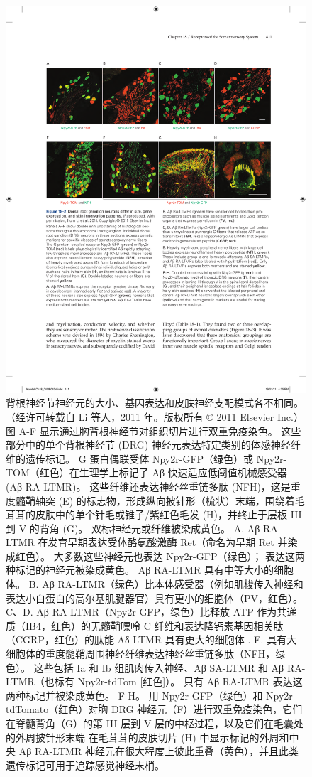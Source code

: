 \begin{figure}[htbp]
	\centering
	\includegraphics[width=1.0\linewidth]{chap18/fig_18_2}
	\caption{背根神经节神经元的大小、基因表达和皮肤神经支配模式各不相同。 （经许可转载自 Li 等人，2011 年。版权所有 © 2011 Elsevier Inc.）图 A-F 显示通过胸背根神经节对组织切片进行双重免疫染色。 
		这些部分中的单个背根神经节 (DRG) 神经元表达特定类别的体感神经纤维的遗传标记。 
		G 蛋白偶联受体 Npy2r-GFP（绿色）或 Npy2r-TOM（红色）在生理学上标记了 Aβ 快速适应低阈值机械感受器 (Aβ RA-LTMR)。 这些纤维还表达神经丝重链多肽 (NFH)，这是重度髓鞘轴突 (E) 的标志物，形成纵向披针形（梳状）末端，围绕着毛茸茸的皮肤中的单个针毛或锥子/紫红色毛发 (H)，并终止于层板 III 到 V 的背角 (G)。 
		双标神经元或纤维被染成黄色。 
		A. Aβ RA-LTMR 在发育早期表达受体酪氨酸激酶 Ret（命名为早期 Ret 并染成红色）。 
		大多数这些神经元也表达 Npy2r-GFP（绿色）； 表达这两种标记的神经元被染成黄色。 Aβ RA-LTMR 具有中等大小的细胞体。 
		B. Aβ RA-LTMR（绿色）比本体感受器（例如肌梭传入神经和表达小白蛋白的高尔基肌腱器官）具有更小的细胞体（PV，红色）。 
		C、D. Aβ RA-LTMR（Npy2r-GFP，绿色）比释放 ATP 作为共递质（IB4，红色）的无髓鞘嘌呤 C 纤维和表达降钙素基因相关肽（CGRP，红色）的肽能 Aδ LTMR 具有更大的细胞体 . E. 具有大细胞体的重度髓鞘周围神经纤维表达神经丝重链多肽（NFH，绿色）。 
		这些包括 Ia 和 Ib 组肌肉传入神经、Aβ SA-LTMR 和 Aβ RA-LTMR（也标有 Npy2r-tdTom [红色]）。 
		只有 Aβ RA-LTMR 表达这两种标记并被染成黄色。 F-H。 
		用 Npy2r-GFP（绿色）和 Npy2r-tdTomato（红色）对胸 DRG 神经元（F）进行双重免疫染色，它们在脊髓背角（G）的第 III 层到 V 层的中枢过程，以及它们在毛囊处的外周披针形末端 在毛茸茸的皮肤切片 (H) 中显示标记的外周和中央 Aβ RA-LTMR 神经元在很大程度上彼此重叠（黄色），并且此类遗传标记可用于追踪感觉神经末梢。}
	\label{fig:18_2}
\end{figure}
